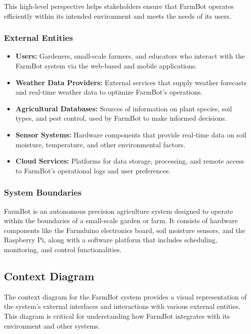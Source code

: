This high-level perspective helps stakeholders ensure that FarmBot operates efficiently within its intended environment and meets the needs of its users.

\subsubsection{External Entities}
\begin{itemize}
    \item \textbf{Users:} Gardeners, small-scale farmers, and educators who interact with the FarmBot system via the web-based and mobile applications.
    \item \textbf{Weather Data Providers:} External services that supply weather forecasts and real-time weather data to optimize FarmBot's operations.
    \item \textbf{Agricultural Databases:} Sources of information on plant species, soil types, and pest control, used by FarmBot to make informed decisions.
    \item \textbf{Sensor Systems:} Hardware components that provide real-time data on soil moisture, temperature, and other environmental factors.
    \item \textbf{Cloud Services:} Platforms for data storage, processing, and remote access to FarmBot's operational logs and user preferences.
\end{itemize}

\subsubsection{System Boundaries}
FarmBot is an autonomous precision agriculture system designed to operate within the boundaries of a small-scale garden or farm. It consists of hardware components like the Farmduino electronics board, soil moisture sensors, and the Raspberry Pi, along with a software platform that includes scheduling, monitoring, and control functionalities.




\subsection{Context Diagram}
The context diagram for the FarmBot system provides a visual representation of the system's external interfaces and interactions with various external entities. This diagram is critical for understanding how FarmBot integrates with its environment and other systems.

